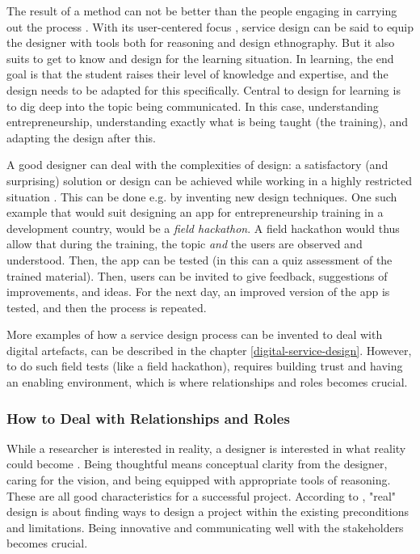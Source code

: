 The result of a method can not be better than the people engaging in carrying out the process \citep{lowgren}. With its user-centered focus \citep{stickdorn}, service design can be said to equip the designer with tools both for reasoning and design ethnography. But it also suits to get to know and design for the learning situation. In learning, the end goal is that the student raises their level of knowledge and expertise, and the design needs to be adapted for this specifically. Central to design for learning is to dig deep into the topic being communicated. In this case, understanding entrepreneurship, understanding exactly what is being taught (the training), and adapting the design after this.

A good designer can deal with the complexities of design: a satisfactory (and surprising) solution or design can be achieved while working in a highly restricted situation \citep{lowgren}. This can be done e.g. by inventing new design techniques. One such example that would suit designing an app for entrepreneurship training in a development country, would be a \textit{field hackathon}. A field hackathon would thus allow that during the training, the topic \textit{and} the users are observed and understood. Then, the app can be tested (in this can a quiz assessment of the trained material). Then, users can be invited to give feedback, suggestions of improvements, and  ideas. For the next day, an improved version of the app is tested, and then the process is repeated.

More examples of how a service design process can be invented to deal with digital artefacts, can be described in the chapter \ref{digital-service-design}. However, to do such field tests (like a field hackathon), requires building trust and having an enabling environment, which is where relationships and roles becomes crucial.

\subsubsection{How to Deal with Relationships and Roles}
While a researcher is interested in reality, a designer is interested in what reality could become \citep{lowgren}. Being thoughtful means conceptual clarity from the designer, caring for the vision, and being equipped with appropriate tools of reasoning. These are all good characteristics for a successful project. According to \cite{lowgren}, "real" design is about finding ways to design a project within the existing preconditions and limitations. Being innovative and communicating well with the stakeholders becomes crucial.


